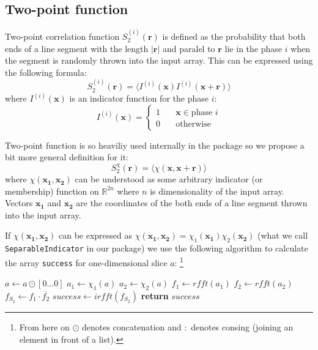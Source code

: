 \documentclass[reprint,amsmath,amssymb,aps,pre,showkeys,showpacs,nofootinbib]{revtex4-1}
\newcommand{\code}[1]{\colorbox{light-gray}{\texttt{#1}}}
\begin{document}
\subsection{Two-point function}
\label{sec:s2}
Two-point correlation function $S_2^{(i)}(\bm{r})$ is defined as the probability
that both ends of a line segment with the length $|\bm{r}|$ and paralel to
$\bm{r}$ lie in the phase $i$ when the segment is randomly thrown into the input
array. This can be expressed using the following formula:
\begin{equation*}
  S_2^{(i)}(\bm{r}) = \langle I^{(i)}(\bm{x}) I^{(i)}(\bm{x} + \bm{r}) \rangle
\end{equation*}
where $I^{(i)}(\bm{x})$ is an indicator function for the phase $i$:
\begin{equation*}
I^{(i)}(\bm{x}) = \left\{
\begin{array}{ll}
  1 & \quad \bm{x} \in \text{phase $i$} \\
  0 & \quad \text{otherwise}
\end{array}
\right.
\end{equation*}

Two-point function is so heaviliy used internally in the package so we propose a
bit more general definition for it:
\begin{equation}
  S_2^{\chi}(\bm{r}) = \langle \chi(\bm{x}, \bm{x} + \bm{r}) \rangle
  \label{eq:s2gen}
\end{equation}
where $\chi(\bm{x_1}, \bm{x_2})$ can be understood as some arbitrary indicator
(or membership) function on $\mathbb{R}^{2n}$ where $n$ is dimensionality of the
input array. Vectors $\bm{x_1}$ and $\bm{x_2}$ are the coordinates of the both
ends of a line segment thrown into the input array.

If $\chi(\bm{x_1}, \bm{x_2})$ can be expressed as
$\chi(\bm{x_1}, \bm{x_2}) = \chi_1(\bm{x_1})\chi_2(\bm{x_2})$ (what we call
\code{SeparableIndicator} in our package) we use the following algorithm to
calculate the array \code{success} for one-dimensional slice $a$: \footnote{From
here on $\odot$ denotes concatenation and $:$ denotes consing (joining an
element in front of a list).}
\begin{algorithmic}[1]
    \State $a \gets a \odot [0 \dots 0]$ 
  \EndIf
  \State $a_1 \gets \chi_1(a)$ 
  \State $a_2 \gets \chi_2(a)$ 
  \State $f_1 \gets rfft(a_1)$ 
  \State $f_2 \gets rfft(a_2)$
  \State $f_{S_2} \gets f_1 \cdot \overline{f_2}$ 
  \State $success \gets irfft(f_{S_2})$ 
  \State \textbf{return} $success$
  \EndProcedure
\end{algorithmic}
\end{document}
